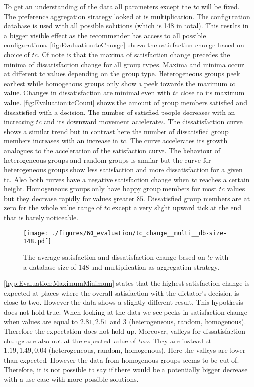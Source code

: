 To get an understanding of the data all parameters except the $tc$ will be fixed. The preference aggregation strategy looked at is multiplication. The configuration database is used with all possible solutions (which is 148 in total). This results in a bigger visible effect as the recommender has access to all possible configurations. \autoref{fig:Evaluation:tcChange} shows the satisfaction change based on choice of $tc$. Of note is that the maxima of satisfaction change precedes the minima of dissatisfaction change for all group types. Maxima and minima occur at different tc values depending on the group type. Heterogeneous groups peek earliest while homogenous groups only show a peek towards the maximum $tc$ value. Changes in dissatisfaction are minimal even with $tc$ close to its maximum value. \autoref{fig:Evaluation:tcCount} shows the amount of group members satisfied and dissatisfied with a decision. The number of satisfied people decreases with an increasing $tc$ and its downward movement accelerates. The dissatisfaction curve shows a similar trend but in contrast here the number of dissatisfied group members increases with an increase in $tc$. The curve accelerates its growth analogues to the acceleration of the satisfaction curve. The behaviour of heterogeneous groups and random groups is similar but the curve for heterogeneous groups show less satisfaction and more dissatisfaction for a given tc. Also both curves have a negative satisfaction change when $tc$ reaches a certain height. Homogeneous groups only have happy group members for most $tc$ values but they decrease rapidly for values greater $85$. Dissatisfied group members are at zero for the whole value range of $tc$ except a very slight upward tick at the end that is barely noticeable.

\begin{figure}
    \centering
    \texttt{[image: ./figures/60\_evaluation/tc\_change\_\_multi\_\_db-size-148.pdf]}
    \caption{The average satisfaction and dissatisfaction change based on $tc$ with a database size of 148 and multiplication as aggregation strategy.}
    \label{fig:Evaluation:tcChange}
\end{figure}

\autoref{hyp:Evaluation:MaximumMinimum} states that the highest satisfaction change is expected at places where the overall satisfaction with the dictator's decision is close to two. However the data shows a slightly different result. This hypothesis does not hold true. When looking at the data we see peeks in satisfaction change when values are equal to $2.81, 2.51$ and $3$ (heterogeneous, random, homogenous). Therefore the expectation does not hold up. Moreover, valleys for dissatisfaction change are also not at the expected value of \textit{two}. They are instead at $1.19, 1.49, 0.04$ (heterogeneous, random, homogenous). Here the valleys are lower than expected. However the data from homogenous groups seems to be cut of. Therefore, it is not possible to say if there would be a potentially bigger decrease with a use case with more possible solutions.

